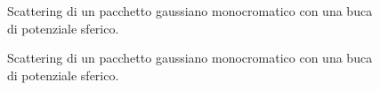 \begin{figure}[!hp]
 \centering
\caption{\small{Scattering di un pacchetto gaussiano monocromatico con una buca di potenziale sferico.}}

\end{figure}
\begin{figure}[!h]
 \centering
  
\caption{\small{Scattering di un pacchetto gaussiano monocromatico con una buca di potenziale sferico.}}

\end{figure}
